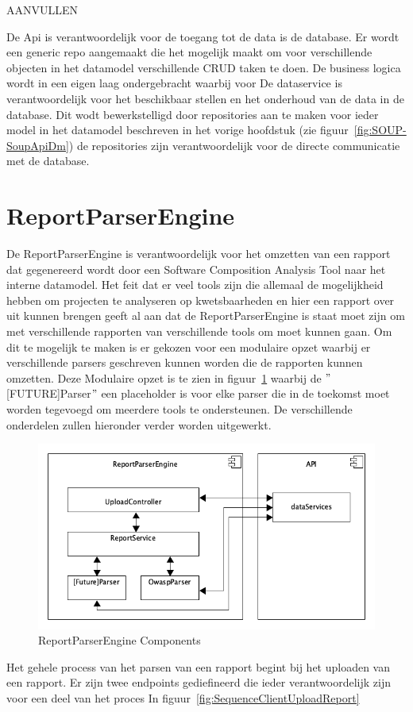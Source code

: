 AANVULLEN



De Api is verantwoordelijk voor de toegang tot de data is de database.
Er wordt een generic repo aangemaakt die het mogelijk maakt om voor verschillende objecten in het datamodel verschillende CRUD taken te doen. De business logica wordt in een eigen laag ondergebracht waarbij voor
De dataservice is verantwoordelijk voor het beschikbaar stellen en het onderhoud van de data in de database. Dit wodt bewerkstelligd door repositories aan te maken voor ieder model in het datamodel beschreven in het vorige hoofdstuk (zie figuur~\ref{fig:SOUP-SoupApiDm}) de repositories zijn verantwoordelijk voor de directe communicatie met de database.

\section{ReportParserEngine}\label{sec:reportparserengine}
De ReportParserEngine is verantwoordelijk voor het omzetten van een rapport dat gegenereerd wordt door een Software Composition Analysis Tool naar het interne datamodel. Het feit dat er veel tools zijn die allemaal de mogelijkheid hebben om projecten te analyseren op kwetsbaarheden en hier een rapport over uit kunnen brengen geeft al aan dat de ReportParserEngine is staat moet zijn om met verschillende rapporten van verschillende tools om moet kunnen gaan. Om dit te mogelijk te maken  is er gekozen voor een modulaire opzet waarbij er verschillende parsers geschreven kunnen worden die de rapporten kunnen omzetten. Deze Modulaire opzet is te zien in figuur~\ref{fig:ReportParserComponents} waarbij de $"$[FUTURE]Parser$"$ een placeholder is voor elke parser die in de toekomst moet worden tegevoegd om meerdere tools te ondersteunen. De verschillende onderdelen zullen hieronder verder worden uitgewerkt.
\begin{figure}[bth]
    \myfloatalign
    \includegraphics[width=12cm]{gfx/umlet/exports/ReportParserComponents}
    \caption{ReportParserEngine Components}
    \label{fig:ReportParserComponents}
\end{figure}
Het gehele process van het parsen van een rapport begint bij het uploaden van een rapport. Er zijn twee endpoints gediefineerd die ieder verantwoordelijk zijn voor een deel van het proces
In figuur~\ref{fig:SequenceClientUploadReport}

